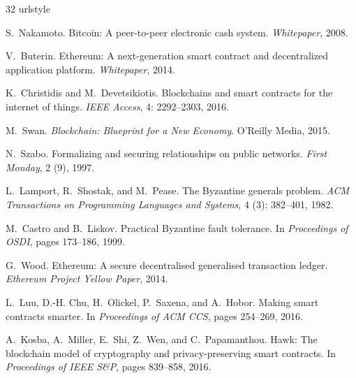 \documentclass[11pt]{article}
\begin{document}
\begin{thebibliography}{32}
\providecommand{\natexlab}[1]{#1}
\providecommand{\url}[1]{\texttt{#1}}
\expandafter\ifx\csname urlstyle\endcsname\relax
  \providecommand{\doi}[1]{doi: #1}\else
  \providecommand{\doi}{doi: \begingroup \urlstyle{rm}\Url}\fi

S.~Nakamoto.
\newblock Bitcoin: A peer-to-peer electronic cash system.
\newblock \emph{Whitepaper}, 2008.

V.~Buterin.
\newblock Ethereum: A next-generation smart contract and decentralized
  application platform.
\newblock \emph{Whitepaper}, 2014.

K.~Christidis and M.~Devetsikiotis.
\newblock Blockchains and smart contracts for the internet of things.
\newblock \emph{IEEE Access}, 4: 2292--2303, 2016.

M.~Swan.
\newblock \emph{Blockchain: Blueprint for a New Economy}.
\newblock O'Reilly Media, 2015.

N.~Szabo.
\newblock Formalizing and securing relationships on public networks.
\newblock \emph{First Monday}, 2 (9), 1997.

L.~Lamport, R.~Shostak, and M.~Pease.
\newblock The Byzantine generals problem.
\newblock \emph{ACM Transactions on Programming Languages and Systems},
  4 (3): 382--401, 1982.

M.~Castro and B.~Liskov.
\newblock Practical Byzantine fault tolerance.
\newblock In \emph{Proceedings of OSDI}, pages 173--186, 1999.

G.~Wood.
\newblock Ethereum: A secure decentralised generalised transaction ledger.
\newblock \emph{Ethereum Project Yellow Paper}, 2014.

L.~Luu, D.-H. Chu, H.~Olickel, P.~Saxena, and A.~Hobor.
\newblock Making smart contracts smarter.
\newblock In \emph{Proceedings of ACM CCS}, pages 254--269, 2016.

A.~Kosba, A.~Miller, E.~Shi, Z.~Wen, and C.~Papamanthou.
\newblock Hawk: The blockchain model of cryptography and privacy-preserving
  smart contracts.
\newblock In \emph{Proceedings of IEEE S\&P}, pages 839--858, 2016.


\end{thebibliography}
\end{document}
